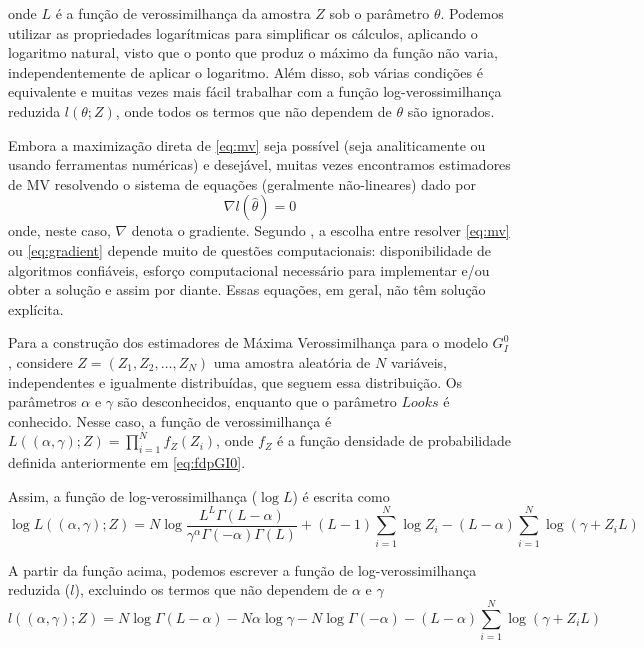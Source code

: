 \documentclass[12pt]{article}
\begin{document}
onde $L$ é a função de verossimilhança da amostra $Z$ sob o parâmetro $\theta$. Podemos utilizar as propriedades logarítmicas para simplificar os cálculos, aplicando o logaritmo natural, visto que o ponto que produz o máximo da função não varia, independentemente de aplicar o logaritmo. Além disso, sob várias condições é equivalente e muitas vezes mais fácil trabalhar com a função log-verossimilhança reduzida $l(\theta; Z)$, onde todos os termos que não dependem de $\theta$ são ignorados.

Embora a maximização direta de \eqref{eq:mv} seja possível (seja analiticamente ou usando ferramentas numéricas) e desejável, muitas vezes encontramos estimadores de MV resolvendo o sistema de equações (geralmente não-lineares) dado por
\begin{equation}
    \nabla l(\widehat{\theta}) = 0 \label{eq:gradient} 
\end{equation}
onde, neste caso, $\nabla$ denota o gradiente. Segundo \citet{FreryMinute2004}, a escolha entre resolver \eqref{eq:mv} ou \eqref{eq:gradient} depende muito de questões computacionais: disponibilidade de algoritmos confiáveis, esforço computacional necessário para implementar e/ou obter a solução e assim por diante. Essas equações, em geral, não têm solução explícita.

Para a construção dos estimadores de Máxima Verossimilhança para o modelo $G_I^0$, considere $Z = (Z_1, Z_2, \dots, Z_N)$ uma amostra aleatória de $N$ variáveis, independentes e igualmente distribuídas, que seguem essa distribuição. Os parâmetros $\alpha$ e $\gamma$ são desconhecidos, enquanto que o parâmetro $Looks$ é conhecido. Nesse caso, a função de verossimilhança é $L((\alpha, \gamma); Z) = \prod_{i=1}^{N} f_Z(Z_i)$, onde $f_Z$ é a função densidade de probabilidade definida anteriormente em \eqref{eq:fdpGI0}. 

Assim, a função de log-verossimilhança ($\log L$) é escrita como
\begin{equation}
    \log L((\alpha, \gamma); Z) = N\log \frac{L^{L}\Gamma(L-\alpha)}{\gamma^{\alpha}\Gamma(-\alpha)\Gamma(L)} +  (L-1)\sum_{i=1}^{N}\log Z_i - (L-\alpha)\sum_{i=1}^{N}\log (\gamma + Z_iL) \label{eq:logVer}
\end{equation}

A partir da função acima, podemos escrever a função de log-verossimilhança reduzida ($l$), excluindo os termos que não dependem de $\alpha$ e $\gamma$
\begin{equation}
    l((\alpha, \gamma); Z) = N\log\Gamma(L-\alpha) - N\alpha \log\gamma - N\log\Gamma(-\alpha) - (L-\alpha)\sum_{i=1}^{N}\log(\gamma +Z_iL) \label{eq:logVerRed}
\end{equation}
\end{document}
